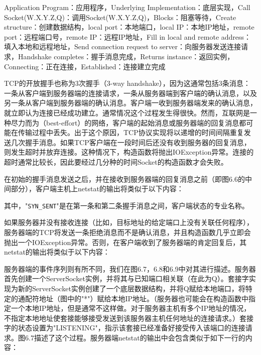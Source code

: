 		Application Program：应用程序，Underlying Implementation：底层实现，Call Socket(W.X.Y.Z,Q)：调用Socket(W.X.Y.Z,Q)，Blocks：阻塞等待，Create structure：创建数据结构，local port：本地端口，local IP：本地IP地址，remote port：远程端口号，remote IP：远程IP地址，Fill in local and remote address：填入本地和远程地址，Send connection request to server：向服务器发送连接请求，Handshake completes：握手消息完成，Returns instance：返回实例，Connecting：正在连接，Established：连接建立完成

		TCP的开放握手也称为3次握手（3-way handshake），因为这通常包括3条消息：一条从客户端到服务器端的连接请求，一条从服务器端到客户端的确认消息，以及另一条从客户端到服务器端的确认消息。客户端一收到服务器端发来的确认消息，就立即认为连接已经成功建立。通常情况这个过程发生得很快。然而，互联网是一种尽力而为（best-effort）的网络，客户端的起始消息或服务器端的回复消息都可能在传输过程中丢失。出于这个原因，TCP协议实现将以递增的时间间隔重复发送几次握手消息。如果TCP客户端在一段时间后还没有收到服务器的回复消息，则发生超时并放弃连接。这种情况下，构造函数将抛出IOException异常。连接的超时通常比较长，因此要经过几分种的时间Socket的构造函数才会失败。

		在初始的握手消息发送之后，并在接收到服务器端的回复消息之前（即图6.6的中间部分），客户端主机上netstat的输出将类似于以下内容：

		

		其中，"\verb|SYN_SENT|"是在第一条和第二条握手消息之间，客户端状态的专业名称。

		如果服务器并没有接收连接（比如，目标地址的给定端口上没有关联任何程序），服务器端的TCP将发送一条拒绝消息而不是确认消息，并且构造函数几乎立即会抛出一个IOException异常。否则，在客户端收到了服务器端的肯定回复后，其netstat的输出将类似于以下内容：

		

		服务器端的事件序列则有所不同，我们在图6.7，6.8和6.9中对其进行描述。服务器首先创建一个ServerSocket实例，并将其与已知端口相关联（在此为Q）。套接字实现为新的ServerSocket实例创建了一个底层数据结构，并将Q赋给本地端口，将特定的通配符地址（图中的"*"）赋给本地IP地址。（服务器也可能会在构造函数中指定一个本地IP地址，但是通常不这样做。对于服务器主机有多个IP地址的情况，不指定本地地址使套接能够接受发送到该服务器主机任何地址的连接请求。）套接字的状态设置为"LISTENING"，指示该套接已经准备好接受传入该端口的连接请求。图6.7描述了这个过程。服务器端netstat的输出中会包含类似于如下一行的内容：

